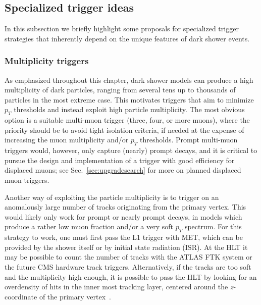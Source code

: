\subsection{Specialized trigger ideas}

In this subsection we briefly highlight some proposals for specialized trigger strategies that inherently depend on the unique features of dark shower events.


\subsubsection{Multiplicity triggers}
\label{sec:darkshowertrigmultiplicity}

As emphasized  throughout this chapter, dark shower models can produce a high multiplicity of dark particles, ranging from several tens up to thousands of particles in the most extreme case. This motivates triggers that aim to minimize $p_T$ thresholds and instead exploit high particle multiplicity. The most obvious option is a suitable multi-muon trigger (three, four, or more muons), where the priority should be to avoid tight isolation criteria, if needed at the expense of increasing the muon multiplicity and/or $p_T$ thresholds. Prompt multi-muon triggers would, however, only capture (nearly) prompt decays, and it is critical to pursue the design and implementation of a trigger with good efficiency for displaced muons; see Sec.~\ref{sec:upgradesearch} for more on planned displaced muon triggers. 

Another way of exploiting the particle multiplicity is to trigger on an anomalously large number of tracks originating from the primary vertex. This would likely only work for prompt or nearly prompt decays, in models which produce a rather low muon fraction and/or a very soft $p_T$ spectrum. For this strategy to work, one must first pass the L1 trigger with MET, which can be provided by the shower itself or by initial state radiation (ISR). At the HLT it may be possible to count the number of tracks with the ATLAS FTK system or the future CMS hardware track triggers. Alternatively, if the tracks are too soft and the multiplicity high enough, it is possible to pass the HLT  by looking for an overdensity of hits in the inner most tracking layer, centered around the $z$-coordinate of the primary vertex~\cite{Knapen:2016hky}.


